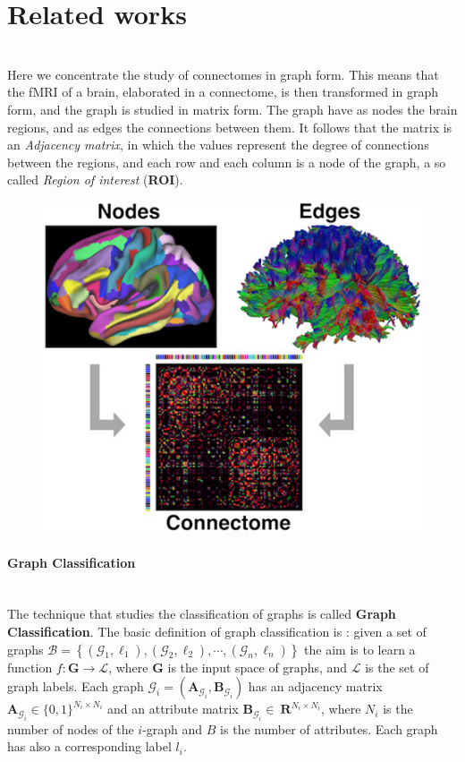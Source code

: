 \section{Related works}\
\\
Here we concentrate the study of connectomes in graph form. This means that the fMRI of a brain, elaborated in a connectome, is then transformed in graph form, and the graph is studied in matrix form. The graph have as nodes the brain regions, and as edges the connections between them. It follows that the matrix is an \emph{Adjacency matrix}, in which the values represent the degree of connections between the regions, and each row and each column is a node of the graph, a so called \emph{Region of interest} (\textbf{ROI}).
\begin{figure}[htbp]
	\centering
	\includegraphics[scale=1]{Immagini/nbm3752-toc-0001-m.jpg}
	\caption{\label{fig:diagram4}}
\end{figure}

\paragraph{Graph Classification}\
\\
The technique that studies the classification of graphs is called \textbf{Graph Classification}. The basic definition of graph classification is \cite{10.1145/3219819.3219980}: given a set of graphs $\mathcal{B}=\left\{\left(\mathcal{G}_{1}, \ell_{1}\right),\left(\mathcal{G}_{2}, \ell_{2}\right), \cdots,\left(\mathcal{G}_{n}, \ell_{n}\right)\right\}$ the aim is to learn a function $f: \mathbf{G} \rightarrow \mathcal{L}$, where $\mathbf{G}$ is the input space of graphs, and $\mathcal{L}$ is the set of graph labels. Each graph $\mathcal{G}_{i}=\left(\mathbf{A}_{\mathcal{G}_{i}}, \mathbf{B}_{\mathcal{G}_{i}}\right)$ has an adjacency matrix $\mathbf{A}_{\mathcal{G}_{i}} \in\{0,1\}^{N_{i} \times N_{i}}$ and an attribute matrix $\mathbf{B}_{\mathcal{G}_{i}} \in\ \mathbf{R}^{N_{i} \times N_{i}}$, where ${N}_{i}$ is the number of nodes of the $i$-graph and $B$ is the number of attributes. Each graph has also a corresponding label $l_{i}$. 	

